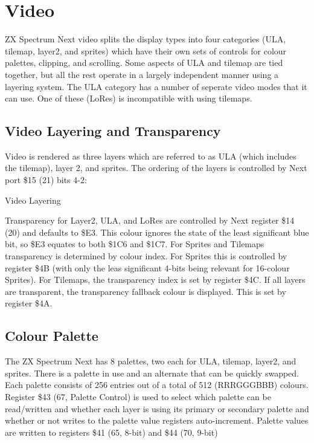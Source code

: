 \chapter{Video}

ZX Spectrum Next video splits the display types into four categories
(ULA, tilemap, layer2, and sprites) which have their own sets of
controls for colour palettes, clipping, and scrolling. Some aspects of
ULA and tilemap are tied together, but all the rest operate in a
largely independent manner using a layering system. The ULA category
has a number of seperate video modes that it can use. One of these
(LoRes) is incompatible with using tilemaps.

\section{Video Layering and Transparency}
Video is rendered as three layers which are referred to as ULA (which
includes the tilemap), layer 2, and sprites.  The ordering of the
layers is controlled by Next port \$15 (21) bits 4-2:

\begin{table}[h]\centering
  \caption{Video Layering}
\end{table}

Transparency for Layer2, ULA, and LoRes are controlled by Next
register \$14 (20) and defaults to \$E3. This colour ignores the state
of the least significant blue bit, so \$E3 equates to both \$1C6 and
\$1C7. For Sprites and Tilemaps transparency is determined by colour
index. For Sprites this is controlled by register \$4B (with only the
leas significant 4-bits being relevant for 16-colour Sprites). For
Tilemaps, the transparency index is set by register \$4C. If all
layers are transparent, the transparency fallback colour is
displayed. This is set by register \$4A.

\section{Colour Palette}

The ZX Spectrum Next has 8 palettes, two each for ULA, tilemap,
layer2, and sprites.  There is a palette in use and an alternate that
can be quickly swapped.  Each palette consists of 256 entries out of a
total of 512 (RRRGGGBBB) colours.  Register \$43 (67, Palette Control)
is used to select which palette can be read/written and whether each
layer is using its primary or secondary palette and whether or not
writes to the palette value registers auto-increment. Palette values
are written to registers \$41 (65, 8-bit) and \$44 (70, 9-bit)

